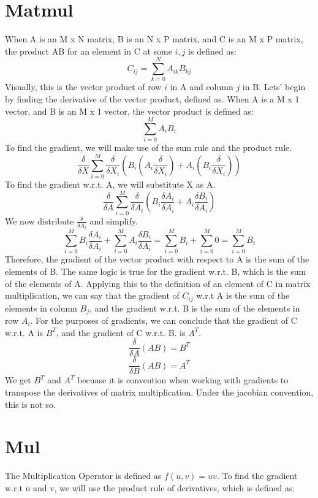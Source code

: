 \documentclass{article}
\begin{document}
    \section{Matmul}
        When A is an M x N matrix, B is an N x P matrix, and C is an M x P matrix, 
        the product AB for an element in C at some $i,j$ is defined as: 
        $$C_{ij} = \sum_{k=0}^{N} A_{ik}B_{kj}$$
        Visually, this is the vector product of row $i$ in A and column $j$ in B. Lets' begin by finding
        the derivative of the vector product, defined as.  When A is a M x 1 vector, and B is an M x 1 vector, the vector product
        is defined as: 
        $$\sum_{i=0}^{M} A_i B_i$$
        To find the gradient, we will make use of the sum rule and the product rule. 
        $$\frac{\delta}{\delta{X}}\sum_{i=0}^{M} \frac{\delta}{\delta{X_i}}(B_i (A_i \frac{\delta}{\delta{X_i}}) + A_i (B_i \frac{\delta}{\delta{X_i}}))$$
        To find the gradient w.r.t. A, we will substitute X as A. 
        $$\frac{\delta}{\delta{A}}\sum_{i=0}^{M} \frac{\delta}{\delta{A_i}}(B_i\frac{\delta{A_i}}{\delta{A_i}} + A_i\frac{\delta{B_i}}{\delta{A_i}})$$
        We now distribute $\frac{\delta}{\delta{A_i}}$ and simplify. 
        $$\sum_{i=0}^{M} B_i\frac{\delta{A_i}}{\delta{A_i}} + \sum_{i=0}^{M} A_i\frac{\delta{B_i}}{\delta{A_i}} = 
        \sum_{i=0}^{M} B_i + \sum_{i=0}^{M} 0 = \sum_{i=0}^{M} B_i$$
        Therefore, the gradient of the vector product with respect to A is the sum of the elements of B. The same logic is true for the gradient w.r.t.
        B, which is the sum of the elements of A. Applying this to the definition of an element of C in matrix multiplication, we can say that the
        gradient of $C_{ij}$ w.r.t A is the sum of the elements in column $B_j$, and the gradient w.r.t. B is the sum of the elements in row $A_i$.
        For the purposes of gradients, we can conclude that the gradient of C w.r.t. A is $B^T$, and the gradient of C w.r.t. B. is $A^T$.
        $$\frac{\delta}{\delta{A}}(AB) = B^T$$
        $$\frac{\delta}{\delta{B}}(AB) = A^T$$
        We get $B^T$ and $A^T$ becuase it is convention when working with gradients to transpose the derivatives of matrix multiplication. Under the
        jacobian convention, this is not so.

\noindent\makebox[\linewidth]{\rule{\paperwidth}{0.4pt}}
    \section{Mul}
        The Multiplication Operator is defined as $f(u, v) = uv$. To find the gradient w.r.t 
        u and v, we will use the product rule of derivatives, which is defined as:
\end{document}
